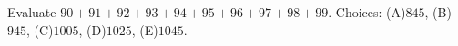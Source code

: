 Evaluate $90+91+92+93+94+95+96+97+98+99$. Choices: (A)$845$, (B)$945$, (C)$1005$, (D)$1025$, (E)$1045$.
